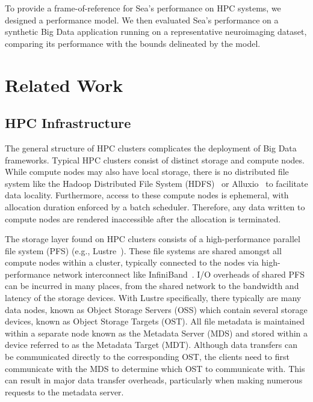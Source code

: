 \documentclass[10pt,journal,compsoc]{IEEEtran}
\begin{document}
To provide a
frame-of-reference for Sea's performance on HPC systems, we designed a
performance model. We then evaluated Sea's performance on a synthetic Big Data
application running on a representative neuroimaging dataset, comparing its
performance with the bounds delineated by the model.



\section{Related Work}
\subsection{HPC Infrastructure}
      The general structure of HPC clusters complicates the deployment of Big
      Data frameworks. Typical HPC clusters consist of distinct storage and
      compute nodes. While compute nodes may also have local storage, there is
      no distributed file system like the Hadoop Distributed File System
      (HDFS)~\cite{shvachko2010hadoop} or Alluxio~\cite{alluxio} to facilitate
      data locality. Furthermore, access to these compute nodes is ephemeral,
      with allocation duration enforced by a batch scheduler. Therefore, any
      data written to compute nodes are rendered inaccessible after the
      allocation is terminated.

      The storage layer found on HPC clusters consists of a high-performance
      parallel file system (PFS) (e.g., Lustre~\cite{lustre}). These file systems
      are shared amongst all compute nodes within a cluster, typically connected
      to the nodes via high-performance network interconnect like
      InfiniBand~\cite{infiniband}. I/O overheads of shared PFS can be incurred
      in many places, from the shared network to the bandwidth and latency of
      the storage devices.  With Lustre specifically, there typically are many
      data nodes, known as Object Storage Servers (OSS) which contain several
      storage devices, known as Object Storage Targets (OST). All file metadata
      is maintained within a separate node known as the Metadata Server (MDS)
      and stored within a device referred to as the Metadata Target (MDT).
      Although data transfers can be communicated directly to the corresponding
      OST, the clients need to first communicate with the MDS to determine which
      OST to communicate with. This can result in major data transfer overheads,
      particularly when making numerous requests to the metadata server.
      
\end{document}
